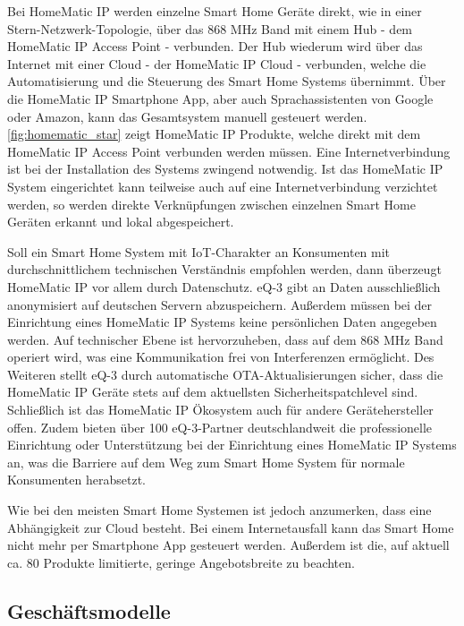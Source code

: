 Bei HomeMatic IP werden einzelne Smart Home Geräte direkt, wie in einer Stern-Netzwerk-Topologie, über das 868 MHz Band mit einem Hub - dem HomeMatic IP Access Point - verbunden.
Der Hub wiederum wird über das Internet mit einer Cloud - der HomeMatic IP Cloud - verbunden, welche die Automatisierung und die Steuerung des Smart Home Systems übernimmt.
Über die HomeMatic IP Smartphone App, aber auch Sprachassistenten von Google oder Amazon, kann das Gesamtsystem manuell gesteuert werden.
\autoref{fig:homematic_star} zeigt HomeMatic IP Produkte, welche direkt mit dem HomeMatic IP Access Point verbunden werden müssen.
Eine Internetverbindung ist bei der Installation des Systems zwingend notwendig.
Ist das HomeMatic IP System eingerichtet kann teilweise auch auf eine Internetverbindung verzichtet werden, so werden direkte Verknüpfungen zwischen einzelnen Smart Home Geräten erkannt und lokal abgespeichert.

Soll ein Smart Home System mit \ac{IoT}-Charakter an Konsumenten mit durchschnittlichem technischen Verständnis empfohlen werden, dann überzeugt HomeMatic IP vor allem durch Datenschutz.
eQ-3 gibt an Daten ausschließlich anonymisiert auf deutschen Servern abzuspeichern.
Außerdem müssen bei der Einrichtung eines HomeMatic IP Systems keine persönlichen Daten angegeben werden.
Auf technischer Ebene ist hervorzuheben, dass auf dem 868 MHz Band operiert wird, was eine Kommunikation frei von Interferenzen ermöglicht.
Des Weiteren stellt eQ-3 durch automatische \ac{OTA}-Aktualisierungen sicher, dass die HomeMatic IP Geräte stets auf dem aktuellsten Sicherheitspatchlevel sind.
Schließlich ist das HomeMatic IP Ökosystem auch für andere Gerätehersteller offen.
Zudem bieten über 100 eQ-3-Partner deutschlandweit die professionelle Einrichtung oder Unterstützung bei der Einrichtung eines HomeMatic IP Systems an, was die Barriere auf dem Weg zum Smart Home System für normale Konsumenten herabsetzt.

Wie bei den meisten Smart Home Systemen ist jedoch anzumerken, dass eine Abhängigkeit zur Cloud besteht.
Bei einem Internetausfall kann das Smart Home nicht mehr per Smartphone App gesteuert werden.
Außerdem ist die, auf aktuell ca. 80 Produkte limitierte, geringe Angebotsbreite zu beachten.

\subsection{Geschäftsmodelle}

